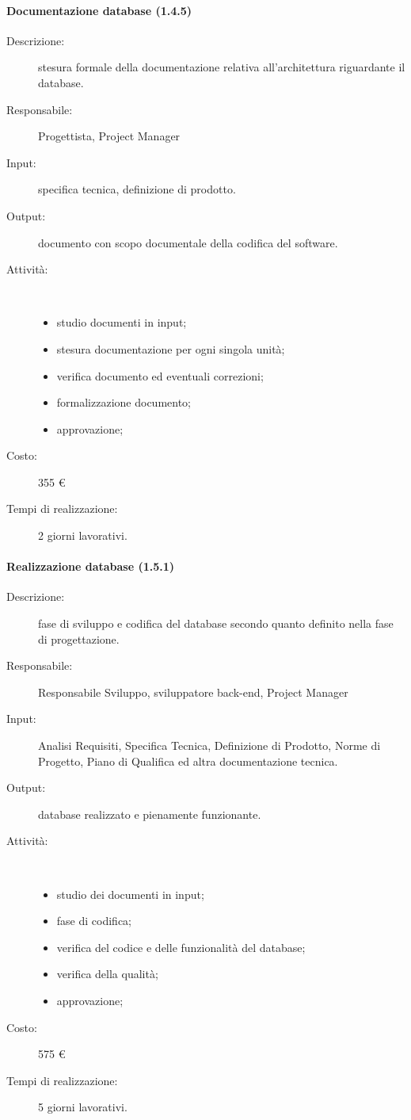 \paragraph{Documentazione database (1.4.5)}
\begin{description}
\item[Descrizione:] stesura formale della documentazione relativa all'architettura riguardante il database.
\item[Responsabile:] Progettista, Project Manager
\item[Input:] specifica tecnica, definizione di prodotto.
\item[Output:] documento con scopo documentale della codifica del software.
\item[Attività:]\mbox{}\\[-1.5\baselineskip]
	\begin{itemize}
	\item studio documenti in input;
	\item stesura documentazione per ogni singola unità;
	\item verifica documento ed eventuali correzioni;
	\item formalizzazione documento;
	\item approvazione;
	\end{itemize}
\item[Costo:] 355 \euro{}
\item[Tempi di realizzazione:] 2 giorni lavorativi.
\end{description}

\paragraph{Realizzazione database (1.5.1)}
\begin{description}
\item[Descrizione:] fase di sviluppo e codifica del database secondo quanto definito nella fase di progettazione.
\item[Responsabile:] Responsabile Sviluppo, sviluppatore back-end, Project Manager
\item[Input:] Analisi Requisiti, Specifica Tecnica, Definizione di Prodotto, Norme di Progetto, Piano di Qualifica ed altra documentazione tecnica.
\item[Output:]database realizzato e pienamente funzionante.
\item[Attività:]\mbox{}\\[-1.5\baselineskip]
	\begin{itemize}
	\item studio dei documenti in input;
	\item fase di codifica;
	\item verifica del codice e delle funzionalit\`{a} del database;
	\item verifica della qualit\`{a};
	\item approvazione;
	\end{itemize}
\item[Costo:] 575 \euro{}
\item[Tempi di realizzazione:] 5 giorni lavorativi.
\end{description}


